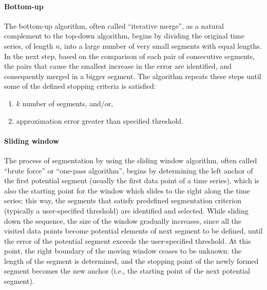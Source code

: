 \documentclass[a4paper]{article}
\begin{document}
\paragraph{Bottom-up} The bottom-up algorithm, often called \enquote{iterative merge}, as a natural complement to the top-down algorithm, begins by dividing the original time series, of length $n$, into a large number of very small segments with equal lengths. In the next step, based on the comparison of each pair of consecutive segments, the pairs that cause the smallest increase in the error are identified, and consequently merged in a bigger segment. The algorithm repeats these steps until some of the defined stopping criteria is satisfied: \begin{enumerate}
	\item $k$ number of segments, and/or,
	\item approximation error greater than specified threshold.
\end{enumerate}

\paragraph{Sliding window} The process of segmentation by using the sliding window algorithm, often called \enquote{brute force} or \enquote{one-pass algorithm}, begins by determining the left anchor of the first potential segment (usually the first data point of a time series), which is also the starting point for the window which slides to the right along the time series; this way, the segments that satisfy predefined segmentation criterion (typically a user-specified threshold) are identified and selected. While sliding down the sequence, the size of the window gradually increases, since all the visited data points become potential elements of next segment to be defined, until the error of the potential segment exceeds the user-specified threshold. At this point, the right boundary of the moving window ceases to be unknown: the length of the segment is determined, and the stopping point of the newly formed segment becomes the new anchor (i.e., the starting point of the next potential segment).
\end{document}
